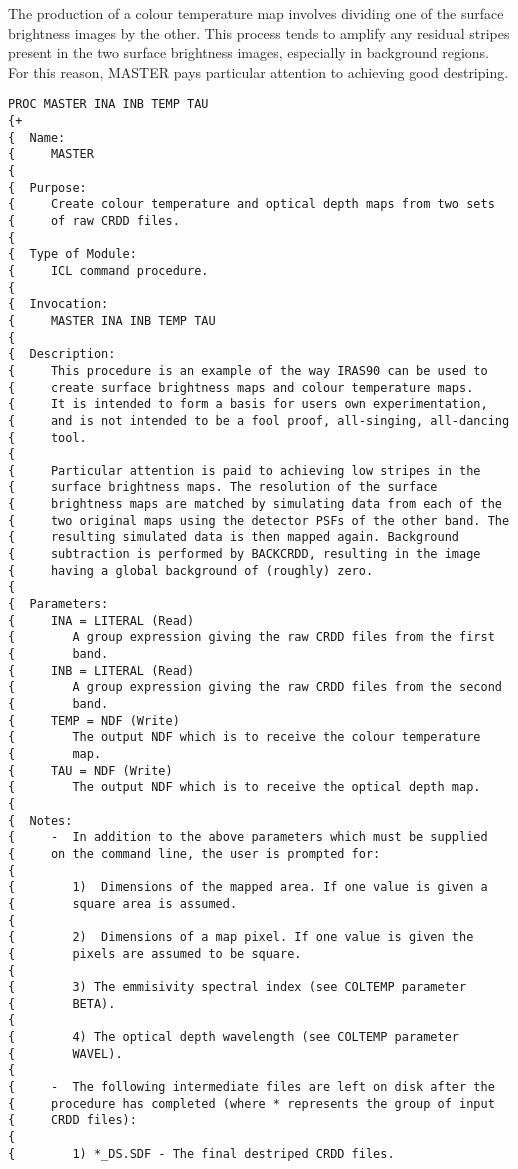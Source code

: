 The production of a colour temperature map involves dividing one of
the surface brightness images by the other. This process tends to amplify any
residual stripes present in the two surface brightness images, especially in
background regions. For this reason, {\small MASTER} pays particular
attention to achieving good destriping.

\small
\begin{verbatim}
PROC MASTER INA INB TEMP TAU
{+
{  Name:
{     MASTER
{
{  Purpose:
{     Create colour temperature and optical depth maps from two sets
{     of raw CRDD files.
{
{  Type of Module:
{     ICL command procedure.
{
{  Invocation:
{     MASTER INA INB TEMP TAU
{
{  Description:
{     This procedure is an example of the way IRAS90 can be used to
{     create surface brightness maps and colour temperature maps.
{     It is intended to form a basis for users own experimentation,
{     and is not intended to be a fool proof, all-singing, all-dancing
{     tool.
{
{     Particular attention is paid to achieving low stripes in the
{     surface brightness maps. The resolution of the surface
{     brightness maps are matched by simulating data from each of the
{     two original maps using the detector PSFs of the other band. The
{     resulting simulated data is then mapped again. Background
{     subtraction is performed by BACKCRDD, resulting in the image
{     having a global background of (roughly) zero.
{
{  Parameters:
{     INA = LITERAL (Read)
{        A group expression giving the raw CRDD files from the first
{        band.
{     INB = LITERAL (Read)
{        A group expression giving the raw CRDD files from the second
{        band.
{     TEMP = NDF (Write)
{        The output NDF which is to receive the colour temperature
{        map.
{     TAU = NDF (Write)
{        The output NDF which is to receive the optical depth map.
{
{  Notes:
{     -  In addition to the above parameters which must be supplied
{     on the command line, the user is prompted for:
{
{        1)  Dimensions of the mapped area. If one value is given a
{        square area is assumed.
{
{        2)  Dimensions of a map pixel. If one value is given the
{        pixels are assumed to be square.
{
{        3) The emmisivity spectral index (see COLTEMP parameter
{        BETA).
{
{        4) The optical depth wavelength (see COLTEMP parameter
{        WAVEL).
{
{     -  The following intermediate files are left on disk after the
{     procedure has completed (where * represents the group of input
{     CRDD files):
{
{        1) *_DS.SDF - The final destriped CRDD files.

\end{verbatim}
